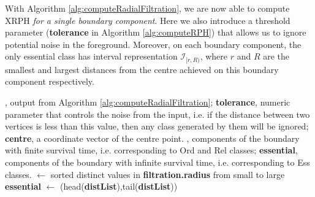 \documentclass[a4paper,11pt]{article}
\theoremstyle{definition}
\begin{document}
With Algorithm \ref{alg:computeRadialFiltration}, we are now able to compute XRPH \emph{for a single boundary component}. Here we also introduce a threshold parameter (\textbf{tolerance} in Algorithm \ref{alg:computeRPH}) that allows us to ignore potential noise in the foreground. Moreover, on each boundary component, the only essential class has interval representation $\mathcal{I}_{[r,R)}$, where $r$ and $R$ are the smallest and largest distances from the centre achieved on this boundary component respectively.

\begin{algorithm}[H]
\caption{\textbf{computeBndryXRPH.} Compute XRPH of the boundary of a connected component}\label{alg:computeRPH}
\begin{algorithmic}
, output from Algorithm \ref{alg:computeRadialFiltration};
\State \;\;\;\;\;\;\;\;\;\;\;\; \textbf{tolerance}, numeric parameter that controls the noise from the input, i.e. if the distance between two vertices is less than this value, then any class generated by them will be ignored;
\State \;\;\;\;\;\;\;\;\;\;\;\; \textbf{centre}, a coordinate vector of the centre point.
, components of the boundary with finite survival time, i.e. corresponding to Ord and Rel classes;
\State \;\;\;\;\;\;\;\;\;\;\;\;\;\;\;\; \textbf{essential}, components of the boundary with infinite survival time, i.e. corresponding to Ess classes.
\vspace{0.2cm}
 $\gets$ sorted distinct values in {\bf filtration.radius} from small to large
    \State \textbf{essential} $\gets$ (head({\bf distList}),tail({\bf distList}))
\EndIf
{} \end{algorithmic} \end{algorithm}
\end{document}
